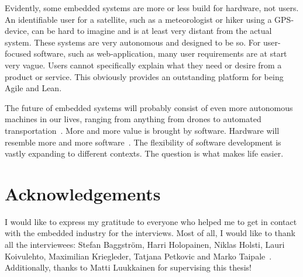 \documentclass[english]{tktltiki2}
\begin{document}
Evidently, some embedded systems are more or less build for hardware, not users. An identifiable user for a satellite, such as a meteorologist or hiker using a GPS-device, can be hard to imagine and is at least very distant from the actual system. These systems are very autonomous and designed to be so. For user-focused software, such as web-application, many user requirements are at start very vague. Users cannot specifically explain what they need or desire from a product or service. This obviously provides an outstanding platform for being Agile and Lean.

The future of embedded systems will probably consist of even more autonomous machines in our lives, ranging from anything from drones to automated transportation~\cite{Kri15}. More and more value is brought by software. Hardware will resemble more and more software~\cite{Hol15a}. The flexibility of software development is vastly expanding to different contexts. The question is what makes life easier.


\section{Acknowledgements}

I would like to express my gratitude to everyone who helped me to get in contact with the embedded industry for the interviews. Most of all, I would like to thank all the interviewees: Stefan Baggström, Harri Holopainen, Niklas Holsti, Lauri Koivulehto, Maximilian Kriegleder, Tatjana Petkovic and Marko Taipale~\cite{BT15, Hol15a, Hol15b, Koi15, Kri15, Pet15}. Additionally, thanks to Matti Luukkainen for supervising this thesis!




\end{document}
